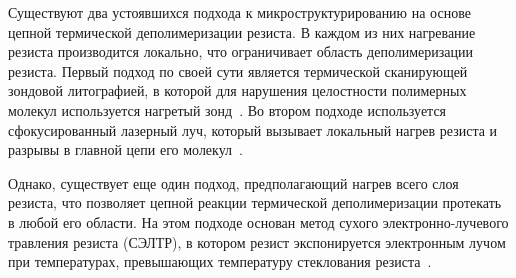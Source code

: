 Существуют два устоявшихся подхода к микроструктурированию на основе цепной термической деполимеризации резиста.
В каждом из них нагревание резиста производится локально, что ограничивает область деполимеризации резиста.
Первый подход по своей сути является термической сканирующей зондовой литографией, в которой для нарушения целостности полимерных молекул используется нагретый зонд~\cite{depol_fabrication_probe}.
Во втором подходе используется сфокусированный лазерный луч, который вызывает локальный нагрев резиста и разрывы в главной цепи его молекул~\cite{depol_fabrication_laser}.

Однако, существует еще один подход, предполагающий нагрев всего слоя резиста, что позволяет цепной реакции термической деполимеризации протекать в любой его области.
На этом подходе основан метод сухого электронно-лучевого травления резиста (СЭЛТР), в котором резист экспонируется электронным лучом при температурах, превышающих температуру стеклования резиста~\cite{Bruk_2016_mee}.
